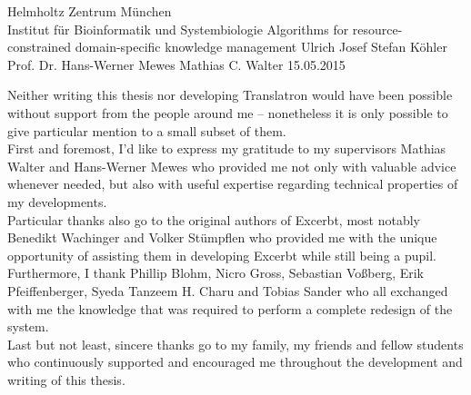 \documentclass[a4paper, 12pt, twoside, reqn]{report}
\numberwithin{figure}{chapter}
\newenvironment{abstractpage}
  {\cleardoublepage\vspace*{\fill}\thispagestyle{empty}}
  {\vfill\cleardoublepage}
\renewenvironment{abstract}[1]
  {\bigskip\selectlanguage{#1}%
   \begin{center}\bfseries\abstractname\end{center}}
  {\par\bigskip}
\newtheorem[L]{boxedDefinition}{Definition}
\newtheorem[L]{boxedExample}{Example}
\begin{document}
\begin{titlepage}
\pagestyle{empty}
              {Helmholtz Zentrum München\\ Institut für Bioinformatik und Systembiologie}
              {Algorithms for resource-constrained domain-specific knowledge management}
              {Ulrich Josef Stefan Köhler}
              {Prof. Dr. Hans-Werner Mewes}
              {Mathias C. Walter}
              {15.05.2015}
\end{titlepage}



\addto{\captionsdutch}{\renewcommand{\abstractname}{Acknowledgements}}

\begin{abstractpage}
\begin{abstract}{dutch} %
Neither writing this thesis nor developing Translatron would have been possible without support from the people around me -- nonetheless it is only possible to give particular mention to a small subset of them.\\

First and foremost, I'd like to express my gratitude to my supervisors Mathias Walter and Hans-Werner Mewes who provided me not only with valuable advice whenever needed, but also with useful expertise regarding technical properties of my developments.\\

Particular thanks also go to the original authors of Excerbt, most notably Benedikt Wachinger and Volker Stümpflen who provided me with the unique opportunity of assisting them in developing Excerbt while still being a pupil. Furthermore, I thank Phillip Blohm, Nicro Gross, Sebastian Voßberg, Erik Pfeiffenberger, Syeda Tanzeem H. Charu and Tobias Sander who all exchanged with me the knowledge that was required to perform a complete redesign of the system.\\

Last but not least, sincere thanks go to my family, my friends and fellow students who continuously supported and encouraged me throughout the development and writing of this thesis.
\vfill
\end{abstract}
\end{abstractpage}
\end{document}
